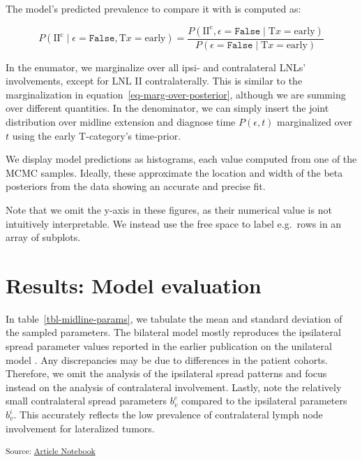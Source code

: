 \documentclass[
  sn-mathphys-num,
]{sn-jnl}
\begin{document}
The model's predicted prevalence to compare it with is computed as:

\[
P \left( \text{II}^\text{c} \mid \epsilon=\texttt{False}, \text{T}x=\text{early} \right) = \frac{P \left( \text{II}^\text{c}, \epsilon=\texttt{False} \mid \text{T}x=\text{early} \right)}{P \left( \epsilon=\texttt{False} \mid \text{T}x=\text{early} \right)}
\]

In the enumator, we marginalize over all ipsi- and contralateral LNLs'
involvements, except for LNL II contralaterally. This is similar to the
marginalization in equation~\ref{eq-marg-over-posterior}, although we
are summing over different quantities. In the denominator, we can simply
insert the joint distribution over midline extension and diagnose time
\(P \left( \epsilon, t \right)\) marginalized over \(t\) using the early
T-category's time-prior.

We display model predictions as histograms, each value computed from one
of the MCMC samples. Ideally, these approximate the location and width
of the beta posteriors from the data showing an accurate and precise
fit.

Note that we omit the y-axis in these figures, as their numerical value
is not intuitively interpretable. We instead use the free space to label
e.g.~rows in an array of subplots.

\section{Results: Model evaluation}\label{sec-results}

In table~\ref{tbl-midline-params}, we tabulate the mean and standard
deviation of the sampled parameters. The bilateral model mostly
reproduces the ipsilateral spread parameter values reported in the
earlier publication on the unilateral model
\citep{ludwig_modelling_2023}. Any discrepancies may be due to
differences in the patient cohorts. Therefore, we omit the analysis of
the ipsilateral spread patterns and focus instead on the analysis of
contralateral involvement. Lastly, note the relatively small
contralateral spread parameters \(b^c_v\) compared to the ipsilateral
parameters \(b^i_v\). This accurately reflects the low prevalence of
contralateral lymph node involvement for lateralized tumors.

\textsubscript{Source:
\href{https://rmnldwg.github.io/bilateral-paper/manuscript.qmd.html}{Article
Notebook}}
\end{document}
